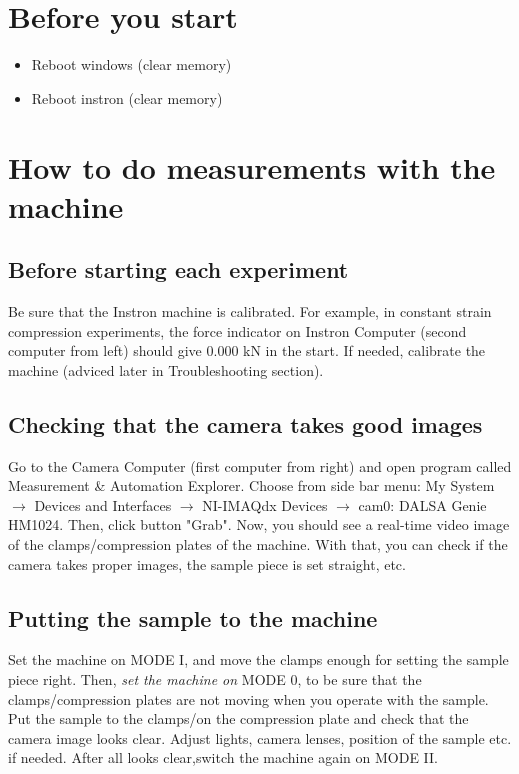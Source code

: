 \documentclass[a4paper]{article}
\begin{document}
\section{Before you start}

\begin{itemize}
  \item Reboot windows (clear memory)
  \item Reboot instron (clear memory)
\end{itemize}

\section{How to do measurements with the machine}

\subsection{Before starting each experiment}

Be sure that the Instron machine is calibrated. For example, in constant
strain compression experiments, the force indicator on Instron Computer 
(second computer from left) should give 0.000 kN in the start. If needed, 
calibrate the machine (adviced later in Troubleshooting section).

\subsection{Checking that the camera takes good images}

Go to the Camera Computer (first computer from right) and open program 
called Measurement \& Automation Explorer. Choose from side bar menu: 
My System $\rightarrow$ Devices and Interfaces $\rightarrow$ NI-IMAQdx Devices 
$\rightarrow$ cam0: DALSA Genie HM1024. Then, click button "Grab". Now, you 
should see a real-time video image of the clamps/compression plates of the 
machine. With that, you can check if the camera takes proper images, the 
sample piece is set straight, etc.

\subsection{Putting the sample to the machine}

Set the machine on \textsf{MODE I}, and move the clamps enough for setting 
the sample piece right. Then, \textit{set the machine on} \textsf{MODE 0}, 
to be sure that the clamps/compression plates are not moving when you operate 
with the sample. Put the sample to the clamps/on the compression plate and 
check that the camera image looks clear. Adjust lights, camera lenses, 
position of the sample etc. if needed. After all looks clear,switch the 
machine again on \textsf{MODE II}.
\end{document}
